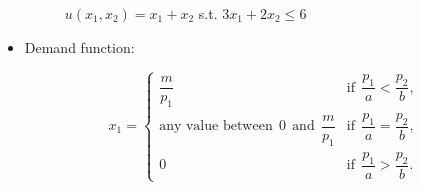\documentclass[
12pt, %
a4paper, %
onecolumn, %
portrait %
]{article}
\begin{document}
\begin{itemize}
\begin{figure}[H]
	\centering
	\caption{$u(x_1,x_2)=x_1+x_2$ s.t. $3x_1+2x_2\le 6$}
	\label{Fig.lable}
\end{figure}



\item Demand function:

\begin{equation*}
x_1=\begin{cases}
\dfrac{m}{p_1}&\text{if}\;\,\dfrac{p_1}{a}<\dfrac{p_2}{b},\\
\text{any value between}\;\,0\;\, \text{and}\;\, \dfrac{m}{p_1}&\text{if}\;\, \dfrac{p_1}{a}=\dfrac{p_2}{b},\\
0&\text{if}\;\,\dfrac{p_1}{a}>\dfrac{p_2}{b}.
\end{cases}
\end{equation*}
   

\end{itemize}
\end{document}
